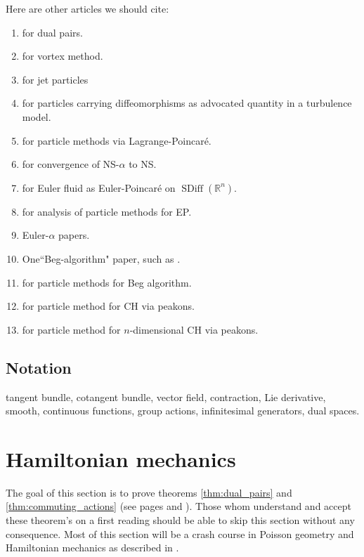 \documentclass[12pt]{amsart}
\newcommand{\R}{\ensuremath{\mathbb{R}}}
\DeclareMathOperator{\SDiff}{SDiff}
\begin{document}
 Here are other articles we should cite:
 \begin{enumerate}
 	\item \cite{MarsdenWeinstein1983,Weinstein1983} for dual pairs.
 	\item \cite{Chorin1973} for vortex method.
	\item \cite{Sommer2013,CotterHolmJacobsMeier2014} for jet particles
	\item \cite{HolmTronci2012} for particles carrying diffeomorphisms as advocated quantity in a turbulence model.
 	\item \cite{JacobsRatiuDesbrun2013} for particle methods via Lagrange-Poincar\'e.
	\item \cite{FoiasHolmTiti2001} for convergence of NS-$\alpha$ to NS.
	\item \cite{Arnold1966} for Euler fluid as Euler-Poincar\'e on $\SDiff(\R^n)$.
	\item \cite{TrouveYounes2005} for analysis of particle methods for EP.
	\item Euler-$\alpha$ papers.
	\item One``Beg-algorithm" paper, such as \cite{Beg2005}.
	\item \cite{JoshiMiller2000} for particle methods for Beg algorithm.
	\item \cite{HoldenRaynaud2006} for particle method for CH via peakons.
	\item \cite{ChertockDuToitMarsden2012} for particle method for $n$-dimensional CH via peakons.
 \end{enumerate}

\subsection{Notation}
tangent bundle, cotangent bundle, vector field, contraction, Lie derivative,
smooth, continuous functions, group actions, infinitesimal generators,
dual spaces.

\section{Hamiltonian mechanics}
\label{sec:Hamiltonian}
The goal of this section is to prove theorems \ref{thm:dual_pairs}
and \ref{thm:commuting_actions} (see pages \pageref{thm:dual_pairs} and \pageref{thm:commuting_actions}).
Those whom understand and accept these theorem's on a first reading
should be able to skip this section without any consequence.
Most of this section will be a crash course in Poisson geometry
and Hamiltonian mechanics as described in \cite{FOM,MandS,Weinstein1983}.
\end{document}
